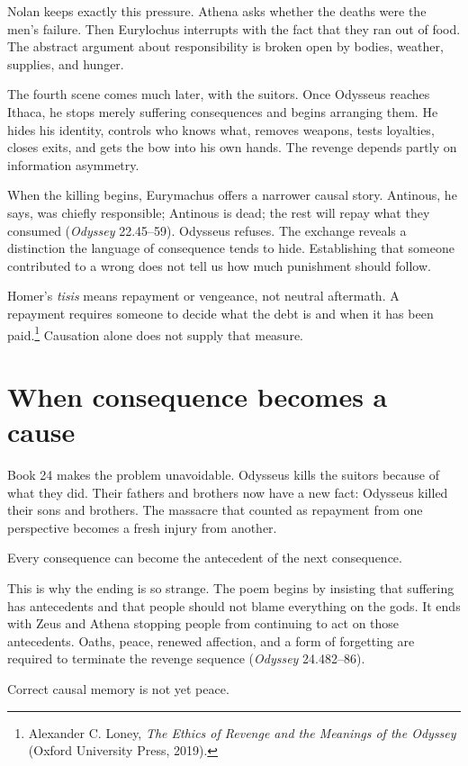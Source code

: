 \documentclass[11pt]{article}
\newcommand{\Od}{\textit{Odyssey}}
\begin{document}
Nolan keeps exactly this pressure. Athena asks whether the deaths were the men's failure. Then Eurylochus interrupts with the fact that they ran out of food. The abstract argument about responsibility is broken open by bodies, weather, supplies, and hunger.

The fourth scene comes much later, with the suitors. Once Odysseus reaches Ithaca, he stops merely suffering consequences and begins arranging them. He hides his identity, controls who knows what, removes weapons, tests loyalties, closes exits, and gets the bow into his own hands. The revenge depends partly on information asymmetry.

When the killing begins, Eurymachus offers a narrower causal story. Antinous, he says, was chiefly responsible; Antinous is dead; the rest will repay what they consumed (\Od{} 22.45--59). Odysseus refuses. The exchange reveals a distinction the language of consequence tends to hide. Establishing that someone contributed to a wrong does not tell us how much punishment should follow.

Homer's \textit{tisis} means repayment or vengeance, not neutral aftermath. A repayment requires someone to decide what the debt is and when it has been paid.\footnote{Alexander C. Loney, \textit{The Ethics of Revenge and the Meanings of the Odyssey} (Oxford University Press, 2019).} Causation alone does not supply that measure.

\section{When consequence becomes a cause}

Book 24 makes the problem unavoidable. Odysseus kills the suitors because of what they did. Their fathers and brothers now have a new fact: Odysseus killed their sons and brothers. The massacre that counted as repayment from one perspective becomes a fresh injury from another.

Every consequence can become the antecedent of the next consequence.

This is why the ending is so strange. The poem begins by insisting that suffering has antecedents and that people should not blame everything on the gods. It ends with Zeus and Athena stopping people from continuing to act on those antecedents. Oaths, peace, renewed affection, and a form of forgetting are required to terminate the revenge sequence (\Od{} 24.482--86).

Correct causal memory is not yet peace.
\end{document}
